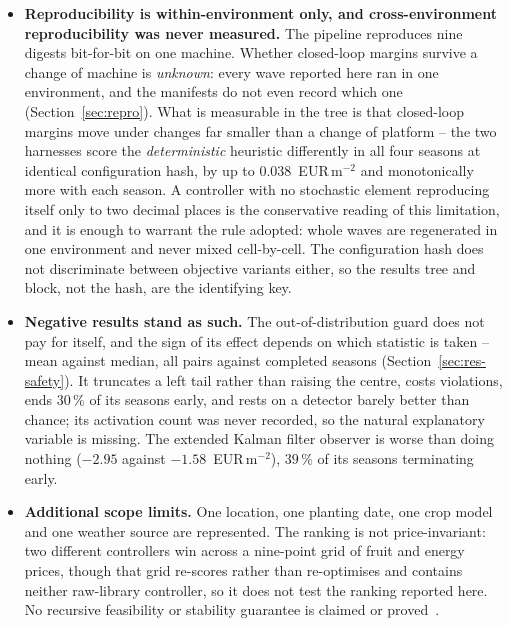 \begin{itemize}
\item \textbf{Reproducibility is within-environment only, and cross-environment
reproducibility was never measured.} The pipeline reproduces nine digests
bit-for-bit on one machine. Whether closed-loop margins survive a change of
machine is \emph{unknown}: every wave reported here ran in one environment, and
the manifests do not even record which one (Section~\ref{sec:repro}). What is
measurable in the tree is that closed-loop margins move under changes far
smaller than a change of platform -- the two harnesses score the
\emph{deterministic} heuristic differently in all four seasons at identical
configuration hash, by up to $0.038$~EUR\,m$^{-2}$ and monotonically more with
each season. A controller with no stochastic element reproducing itself only to
two decimal places is the conservative reading of this limitation, and it is
enough to warrant the rule adopted: whole waves are regenerated in one
environment and never mixed cell-by-cell.
The configuration hash does not discriminate between objective variants either,
so the results tree and block, not the hash, are the identifying key.

\item \textbf{Negative results stand as such.} The out-of-distribution guard
does not pay for itself, and the sign of its effect depends on which statistic is
taken -- mean against median, all pairs against completed seasons
(Section~\ref{sec:res-safety}). It truncates a left tail rather than raising the
centre, costs violations, ends $30\,\%$ of its seasons early, and rests on a
detector barely better than chance; its activation count was never recorded, so
the natural explanatory variable is missing. The extended Kalman filter observer
is worse than doing nothing ($-2.95$ against $-1.58$~EUR\,m$^{-2}$), $39\,\%$ of
its seasons terminating early.

\item \textbf{Additional scope limits.} One location, one planting date, one crop model
and one weather source are represented. The ranking is not price-invariant: two different
controllers win across a nine-point grid of fruit and energy prices, though
that grid re-scores rather than re-optimises and contains neither raw-library
controller, so it does not test the ranking reported here.
No recursive feasibility or stability guarantee is claimed or
proved~\cite{mayne2000}.

\end{itemize}

